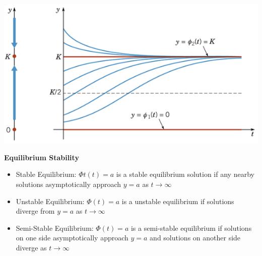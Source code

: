\documentclass{article}
\begin{document}
\begin{center}
    \includegraphics[scale=0.6]{yvst.png}
\end{center}
\textbf{Equilibrium Stability}
\begin{itemize}
    \item Stable Equilibrium: $\Phi t(t)=a$ is a stable equilibrium solution if any nearby solutions asymptotically approach $y=a$ as $t\rightarrow\infty$
    \item Unstable Equilibrium: $\Phi (t)=a$ is a unstable equilibrium if solutions diverge from $y=a$ as $t\rightarrow\infty$
    \item Semi-Stable Equilibrium: $\Phi (t)=a$ is a semi-stable equilibrium if solutions on one side asymptotically approach $y=a$ and solutions on another side diverge as $t\rightarrow\infty$
\end{itemize}
\end{document}
